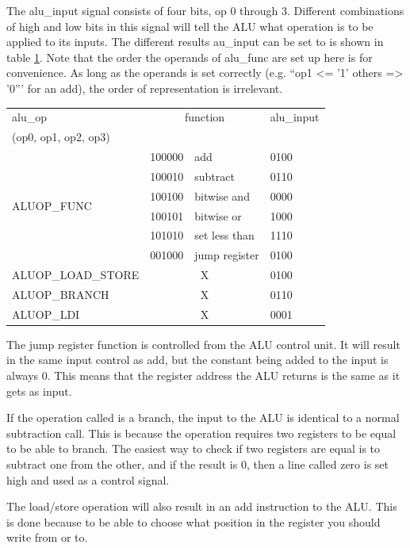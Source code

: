 The alu\_input signal consists of four bits, op 0 through 3. Different combinations of high and low bits in this signal will tell the ALU what operation is to be applied to its inputs.  The different results au\_input can be set to is shown in table \ref{table:alu_control_table}. Note that the order the operands of alu\_func are set up here is for convenience. As long as the operands is set correctly (e.g. ``op1 <= '1' others => '0''' for an add), the order of representation is irrelevant. 
\begin{table}[h]
	\label{table:alu_control_table}
	\centering
    \begin{tabular}{|l|l|l|l|}
    \hline
    alu\_op           				& \multicolumn {2}{c}{function} 	& alu\_input\\(op0, op1, op2, op3) \\ \hline
    \multirow {6}{*}{ALUOP\_FUNC}	& 100000   & add         			& 0100                            \\
                    				& 100010   & subtract  	 			& 0110                            \\
                    				& 100100   & bitwise and 			& 0000                            \\
                    				& 100101   & bitwise or    			& 1000                            \\
                    				& 101010   & set less than 			& 1110                            \\
									& 001000   & jump register 			& 0100                            \\ \hline
    ALUOP\_LOAD\_STORE 				& \multicolumn {2}{c}{X}			& 0100                            \\ \hline
    ALUOP\_BRANCH     				& \multicolumn {2}{c}{X} 			& 0110                            \\ \hline
    ALUOP\_LDI        				& \multicolumn {2}{c}{X} 			& 0001                            \\ \hline
    \end{tabular}
\end{table}
The jump register function is controlled from the ALU control unit. It will result in the same input control as add, but the constant being added to the input is always 0. This means that the register address the ALU returns is the same as it gets as input. 

If the operation called is a branch, the input to the ALU is identical to a normal subtraction call. This is because the operation requires two registers to be equal to be able to branch. The easiest way to check if two registers are equal is to subtract one from the other, and if the result is 0, then a line called zero is set high and used as a control signal. 

The load/store operation will also result in an add instruction to the ALU. This is done because to be able to choose what position in the register you should write from or to. 
